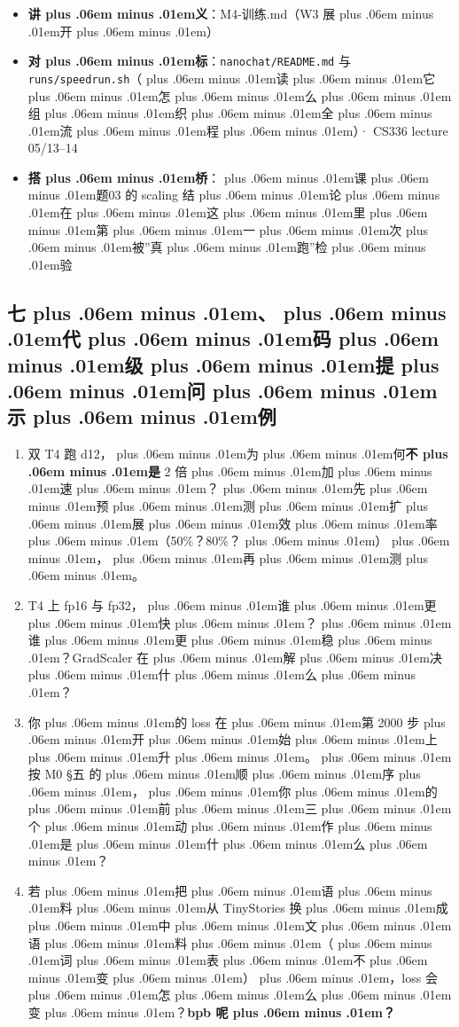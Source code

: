 \documentclass[
]{article}
\newcommand{\passthrough}[1]{#1}
\providecommand{\tightlist}{%
  \setlength{\itemsep}{0pt}\setlength{\parskip}{0pt}}
\def\zh#1{{\zhfont #1}}
\def\sym#1{{\symfont #1}}
\def\codezh#1{{\zhmonofont #1}}
\def\zhglue{\hskip0pt plus .06em minus .01em}
\begin{document}
\begin{itemize}
\tightlist
\item
  \textbf{\zh{讲\zhglue 义}}\zh{：}\passthrough{\codezh{M4-{\zh{训}}{\zh{练}}.md}}\zh{（}W3 \zh{展\zhglue 开\zhglue ）}
\item
  \textbf{\zh{对\zhglue 标}}\zh{：}\passthrough{\lstinline!nanochat/README.md!} \zh{与} \passthrough{\lstinline!runs/speedrun.sh!}\zh{（\zhglue 读\zhglue 它\zhglue 怎\zhglue 么\zhglue 组\zhglue 织\zhglue 全\zhglue 流\zhglue 程\zhglue ）}\sym{·} CS336 lecture 05/13--14
\item
  \textbf{\zh{搭\zhglue 桥}}\zh{：\zhglue 课\zhglue 题}03 \zh{的} scaling \zh{结\zhglue 论\zhglue 在\zhglue 这\zhglue 里\zhglue 第\zhglue 一\zhglue 次\zhglue 被}''\zh{真\zhglue 跑}''\zh{检\zhglue 验}
\end{itemize}

\subsection{\zh{七\zhglue 、\zhglue 代\zhglue 码\zhglue 级\zhglue 提\zhglue 问\zhglue 示\zhglue 例}}\label{ux4e03ux4ee3ux7801ux7ea7ux63d0ux95eeux793aux4f8b}

\begin{enumerate}
\def\labelenumi{\arabic{enumi}.}
\tightlist
\item
  \zh{双} T4 \zh{跑} d12\zh{，\zhglue 为\zhglue 何}\textbf{\zh{不\zhglue 是}} 2 \zh{倍\zhglue 加\zhglue 速\zhglue ？\zhglue 先\zhglue 预\zhglue 测\zhglue 扩\zhglue 展\zhglue 效\zhglue 率\zhglue （}50\%\zh{？}80\%\zh{？\zhglue ）\zhglue ，\zhglue 再\zhglue 测\zhglue 。}
\item
  T4 \zh{上} fp16 \zh{与} fp32\zh{，\zhglue 谁\zhglue 更\zhglue 快\zhglue ？\zhglue 谁\zhglue 更\zhglue 稳\zhglue ？}GradScaler \zh{在\zhglue 解\zhglue 决\zhglue 什\zhglue 么\zhglue ？}
\item
  \zh{你\zhglue 的} loss \zh{在\zhglue 第} 2000 \zh{步\zhglue 开\zhglue 始\zhglue 上\zhglue 升\zhglue 。\zhglue 按} M0 \sym{§}\zh{五} \zh{的\zhglue 顺\zhglue 序\zhglue ，\zhglue 你\zhglue 的\zhglue 前\zhglue 三\zhglue 个\zhglue 动\zhglue 作\zhglue 是\zhglue 什\zhglue 么\zhglue ？}
\item
  \zh{若\zhglue 把\zhglue 语\zhglue 料\zhglue 从} TinyStories \zh{换\zhglue 成\zhglue 中\zhglue 文\zhglue 语\zhglue 料\zhglue （\zhglue 词\zhglue 表\zhglue 不\zhglue 变\zhglue ）\zhglue ，}loss \zh{会\zhglue 怎\zhglue 么\zhglue 变\zhglue ？}\textbf{bpb \zh{呢\zhglue ？}}
\end{enumerate}
\end{document}
